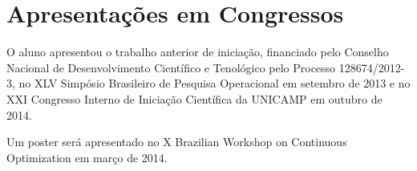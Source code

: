 \section{Apresentações em Congressos}
O aluno apresentou o trabalho anterior de iniciação, financiado pelo Conselho
Nacional de Desenvolvimento Científico e Tenológico pelo Processo
128674/2012-3, no XLV Simpósio Brasileiro de Pesquisa Operacional em setembro
de 2013 e no XXI Congresso Interno de Iniciação Científica da UNICAMP em
outubro de 2014.

Um poster será apresentado no X Brazilian Workshop on Continuous Optimization
em março de 2014.
